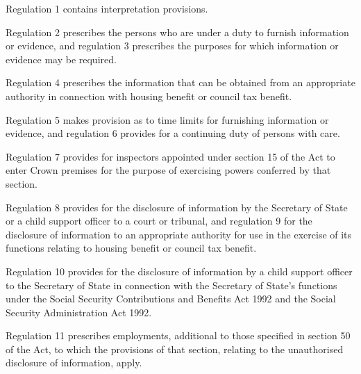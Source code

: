 \documentclass[a4paper,12pt]{article}
\begin{document}
  Regulation 1 contains interpretation provisions.

  Regulation 2 prescribes the persons who are under a duty to furnish information or evidence, and regulation 3 prescribes the purposes for which information or evidence may be required.

  Regulation 4 prescribes the information that can be obtained from an appropriate authority in connection with housing benefit or council tax benefit.

  Regulation 5 makes provision as to time limits for furnishing information or evidence, and regulation 6 provides for a continuing duty of persons with care.

  Regulation 7 provides for inspectors appointed under section 15 of the Act to enter Crown premises for the purpose of exercising powers conferred by that section.

  Regulation 8 provides for the disclosure of information by the Secretary of State or a child support officer to a court or tribunal, and regulation 9 for the disclosure of information to an appropriate authority for use in the exercise of its functions relating to housing benefit or council tax benefit.

  Regulation 10 provides for the disclosure of information by a child support officer to the Secretary of State in connection with the Secretary of State’s functions under the Social Security Contributions and Benefits Act 1992 and the Social Security Administration Act 1992.

  Regulation 11 prescribes employments, additional to those specified in section 50 of the Act, to which the provisions of that section, relating to the unauthorised disclosure of information, apply.
\end{document}
